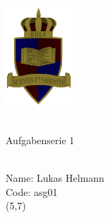 \documentclass[a4paper]{article}
\newcommand{\partcode}{asg01}
\begin{document}
	
	\vspace*{-2cm}
	\parbox{4cm}{\includegraphics[width=2.5cm]{../images/ROLF4.png}}
	\parbox{10.6cm}{ \\ Aufgabenserie 1  \\ \vspace*{-.5cm} }
	\thispagestyle{empty}	
	\vspace{1cm}\\
	\noindent
	Name: Lukas Helmann\\
	Code: \partcode
	\\
\@dtlforeachrow(5,7) 
\end{document}
